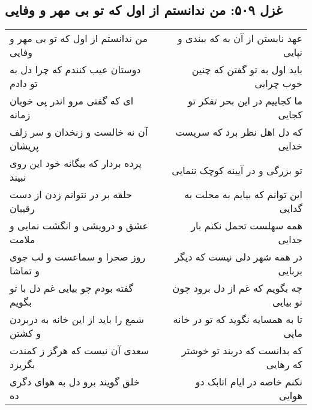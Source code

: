 \begin{center}
\section*{غزل ۵۰۹: من ندانستم از اول که تو بی مهر و وفایی}
\label{sec:509}
\begin{longtable}{l p{0.5cm} r}
من ندانستم از اول که تو بی مهر و وفایی
&&
عهد نابستن از آن به که ببندی و نپایی
\\
دوستان عیب کنندم که چرا دل به تو دادم
&&
باید اول به تو گفتن که چنین خوب چرایی
\\
ای که گفتی مرو اندر پی خوبان زمانه
&&
ما کجاییم در این بحر تفکر تو کجایی
\\
آن نه خالست و زنخدان و سر زلف پریشان
&&
که دل اهل نظر برد که سریست خدایی
\\
پرده بردار که بیگانه خود این روی نبیند
&&
تو بزرگی و در آیینه کوچک ننمایی
\\
حلقه بر در نتوانم زدن از دست رقیبان
&&
این توانم که بیایم به محلت به گدایی
\\
عشق و درویشی و انگشت نمایی و ملامت
&&
همه سهلست تحمل نکنم بار جدایی
\\
روز صحرا و سماعست و لب جوی و تماشا
&&
در همه شهر دلی نیست که دیگر بربایی
\\
گفته بودم چو بیایی غم دل با تو بگویم
&&
چه بگویم که غم از دل برود چون تو بیایی
\\
شمع را باید از این خانه به دربردن و کشتن
&&
تا به همسایه نگوید که تو در خانه مایی
\\
سعدی آن نیست که هرگز ز کمندت بگریزد
&&
که بدانست که دربند تو خوشتر که رهایی
\\
خلق گویند برو دل به هوای دگری ده
&&
نکنم خاصه در ایام اتابک دو هوایی
\\
\end{longtable}
\end{center}

